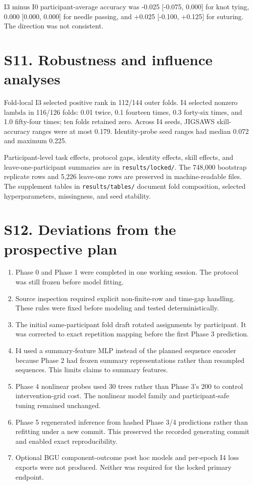 \documentclass[11pt]{article}
\providecommand{\tightlist}{\setlength{\itemsep}{0pt}\setlength{\parskip}{0pt}}
\begin{document}
I3 minus I0 participant-average accuracy was -0.025 {[}-0.075, 0.000{]}
for knot tying, 0.000 {[}0.000, 0.000{]} for needle passing, and +0.025
{[}-0.100, +0.125{]} for suturing. The direction was not consistent.

\section{S11. Robustness and influence
analyses}\label{s11.-robustness-and-influence-analyses}

Fold-local I3 selected positive rank in 112/144 outer folds. I4 selected
nonzero lambda in 116/126 folds: 0.01 twice, 0.1 fourteen times, 0.3
forty-six times, and 1.0 fifty-four times; ten folds retained zero.
Across I4 seeds, JIGSAWS skill-accuracy ranges were at most 0.179.
Identity-probe seed ranges had median 0.072 and maximum 0.225.

Participant-level task effects, protocol gaps, identity effects, skill
effects, and leave-one-participant summaries are in
\texttt{results/locked/}. The 748,000 bootstrap replicate rows and 5,226
leave-one rows are preserved in machine-readable files. The supplement
tables in \texttt{results/tables/} document fold composition, selected
hyperparameters, missingness, and seed stability.

\section{S12. Deviations from the prospective
plan}\label{s12.-deviations-from-the-prospective-plan}

\begin{enumerate}
\def\labelenumi{\arabic{enumi}.}
\tightlist
\item
  Phase 0 and Phase 1 were completed in one working session. The
  protocol was still frozen before model fitting.
\item
  Source inspection required explicit non-finite-row and time-gap
  handling. These rules were fixed before modeling and tested
  deterministically.
\item
  The initial same-participant fold draft rotated assignments by
  participant. It was corrected to exact repetition mapping before the
  first Phase 3 prediction.
\item
  I4 used a summary-feature MLP instead of the planned sequence encoder
  because Phase 2 had frozen summary representations rather than
  resampled sequences. This limits claims to summary features.
\item
  Phase 4 nonlinear probes used 30 trees rather than Phase 3's 200 to
  control intervention-grid cost. The nonlinear model family and
  participant-safe tuning remained unchanged.
\item
  Phase 5 regenerated inference from hashed Phase 3/4 predictions rather
  than refitting under a new commit. This preserved the recorded
  generating commit and enabled exact reproducibility.
\item
  Optional BGU component-outcome post hoc models and per-epoch I4 loss
  exports were not produced. Neither was required for the locked primary
  endpoint.
\end{enumerate}
\end{document}
